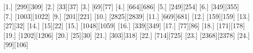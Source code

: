 [1.] [299][309]
[2.] [33][37]
[3.] [69][77]
[4.] [664][686]
[5.] [249][254]
[6.] [349][355]
[7.] [1003][1022]
[9.] [201][221]
[10.] [2825][2839]
[11.] [669][681]
[12.] [159][159]
[13.] [27][32]
[14.] [15][22]
[15.] [1048][1059]
[16.] [339][349]
[17.] [77][86]
[18.] [171][178]
[19.] [1202][1206]
[20.] [25][30]
[21.] [303][318]
[22.] [714][725]
[23.] [2368][2378]
[24.] [99][106]
